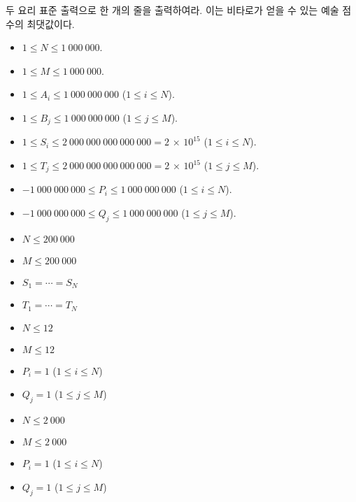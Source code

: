 \begin{problem}{두 요리}
	표준 출력으로 한 개의 줄을 출력하여라. 이는 비타로가 얻을 수 있는 예술 점수의 최댓값이다.
		
	\Constraints
	
	\begin{itemize}
		\item $1 \le N \le 1\ 000\ 000$.
		\item $1 \le M \le 1\ 000\ 000$.
		\item $1 \le A_i \le 1\ 000\ 000\ 000$ ($1 \le i \le N$).
		\item $1 \le B_j \le 1\ 000\ 000\ 000$ ($1 \le j \le M$).
		\item $1 \le S_i \le 2\ 000\ 000\ 000\ 000\ 000 = 2$ × $10^{15}$ ($1 \le i \le N$).
		\item $1 \le T_j \le 2\ 000\ 000\ 000\ 000\ 000 = 2$ × $10^{15}$ ($1 \le j \le M$).
		\item $-1\ 000\ 000\ 000 \le P_i \le 1\ 000\ 000\ 000$ ($1 \le i \le N$).
		\item $-1\ 000\ 000\ 000 \le Q_j \le 1\ 000\ 000\ 000$ ($1 \le j \le M$).
	\end{itemize}
	
	
	\begin{itemize}
		\item $N \le 200\ 000$
		\item $M \le 200\ 000$
		\item $S_1 = \cdots = S_N$
		\item $T_1 = \cdots = T_N$
	\end{itemize}


	\begin{itemize}
		\item $N \le 12$
		\item $M \le 12$
		\item $P_i = 1$ ($1 \le i \le N$)
		\item $Q_j = 1$ ($1 \le j \le M$)
	\end{itemize}



	\begin{itemize}
		\item $N \le 2\ 000$
		\item $M \le 2\ 000$
		\item $P_i = 1$ ($1 \le i \le N$)
		\item $Q_j = 1$ ($1 \le j \le M$)
	\end{itemize}




\end{problem}
